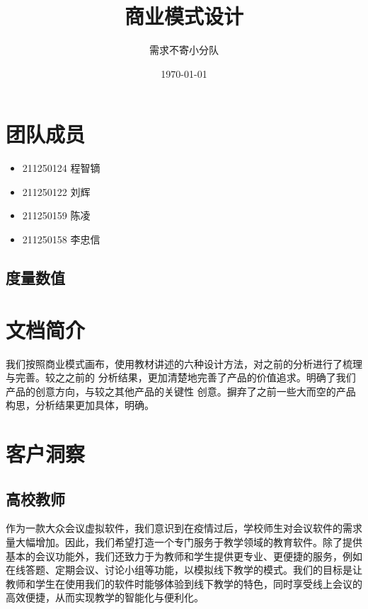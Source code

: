 \documentclass[a4paper,12pt]{article}
\title{商业模式设计}
\author{需求不寄小分队}
\date{\today}
\begin{document}
    \maketitle

    \tableofcontents

    \section{团队成员}
    \begin{itemize}
        \item 211250124 程智镝
        \item 211250122 刘辉
        \item 211250159 陈凌
        \item 211250158 李忠信
    \end{itemize}

    \subsection{度量数值}

    \section{文档简介}
    我们按照商业模式画布，使用教材讲述的六种设计方法，对之前的分析进行了梳理与完善。较之之前的
    分析结果，更加清楚地完善了产品的价值追求。明确了我们产品的创意方向，与较之其他产品的关键性
    创意。摒弃了之前一些大而空的产品构思，分析结果更加具体，明确。

    \section{客户洞察}
    \subsection{高校教师}
    作为一款大众会议虚拟软件，我们意识到在疫情过后，学校师生对会议软件的需求量大幅增加。因此，我们希望打造一个专门服务于教学领域的教育软件。除了提供基本的会议功能外，我们还致力于为教师和学生提供更专业、更便捷的服务，例如在线答题、定期会议、讨论小组等功能，以模拟线下教学的模式。我们的目标是让教师和学生在使用我们的软件时能够体验到线下教学的特色，同时享受线上会议的高效便捷，从而实现教学的智能化与便利化。
\end{document}
